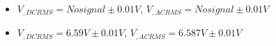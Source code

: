 \begin{itemize}
     \item $V_{, DCRMS}=No signal\pm 0.01\unit{V}$, $V_{, ACRMS}=No signal\pm 0.01\unit{V}$ 
     \item $V_{, DCRMS}=6.59V\pm 0.01\unit{V}$, $V_{, ACRMS}=6.587V\pm 0.01\unit{V}$\\
\end{itemize}